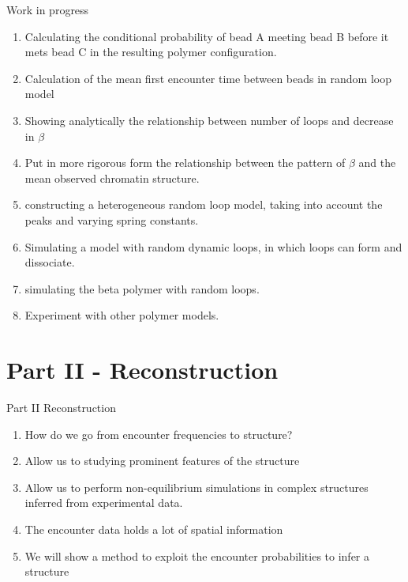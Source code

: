 \documentclass[8pt]{beamer}
\begin{document}
\begin{frame}{Work in progress}
\begin{enumerate}
\item Calculating the conditional probability of bead A meeting bead B before it mets bead C in the resulting polymer configuration. 
\item Calculation of the mean first encounter time between beads in random loop model 
\item Showing analytically the relationship between number of loops and decrease in $\beta$
\item Put in more rigorous form the relationship between the pattern of $\beta$ and the mean observed chromatin structure.
\item constructing a heterogeneous random loop model, taking into account the peaks and varying spring constants.
\item Simulating a model with random dynamic loops, in which loops can form and dissociate.
\item simulating the beta polymer with random loops. 
\item Experiment with other polymer models.
\end{enumerate}
\end{frame}

\section{Part II - Reconstruction}\label{section_partII} 
\begin{frame}{Part II Reconstruction}
\begin{enumerate}
\item How do we go from encounter frequencies to structure?
\item Allow us to studying prominent features of the structure 
\item Allow us to perform non-equilibrium simulations in complex structures inferred from experimental data. 
\item The encounter data holds a lot of spatial information 
\item We will show a method to exploit the encounter probabilities to infer a structure
\end{enumerate}
\end{frame}
\end{document}

